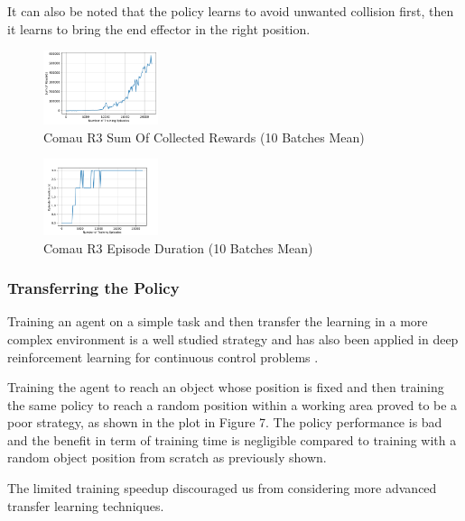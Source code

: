 \documentclass{sig-alternate-05-2015}
\begin{document}
It can also be noted that the policy learns to avoid unwanted collision first, then it learns to bring the end effector in the right position. 

\begin{figure}[ht] \label{R3RewPlot}
\centering
\includegraphics[width=0.3\textwidth]{Plots/R3Rew.pdf}
\caption{Comau R3 Sum Of Collected \newline Rewards (10 Batches Mean)}
\end{figure}

\begin{figure}[ht] \label{R3TimePlot}
\centering
\includegraphics[width=0.3\textwidth]{Plots/R3Time.pdf}
\caption{Comau R3 Episode Duration \newline (10 Batches Mean)}
\end{figure}

\subsubsection{Transferring the Policy}
Training an agent on a simple task and then transfer the learning in a more complex environment is a well studied strategy and has also been applied in deep reinforcement learning for continuous control problems \cite{Berseth18}.
%

Training the agent to reach an object whose position is fixed and then training the same policy to reach a random position within a working area proved to be a poor strategy, as shown in the plot in Figure 7. The policy performance is bad and the benefit in term of training time is negligible  compared to training with a random object position from scratch as previously shown.

The limited training speedup discouraged us from considering more advanced transfer learning techniques.
\end{document}
